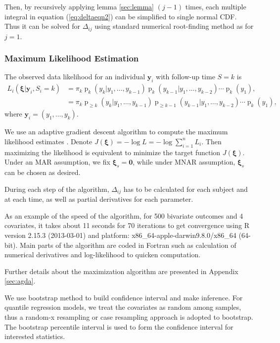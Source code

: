 \documentclass[12pt]{article}
\DeclareMathOperator{\pr}{p}
\begin{document}
\begin{itemize}
  Then, by recursively applying lemma \ref{sec:lemma} $(j-1)$ times,
  each multiple integral in equation (\ref{eq:deltaeqn2}) can be
  simplified to single normal CDF. Thus it can be solved for
  $\Delta_{ij}$ using standard numerical root-finding method as for $j
  = 1$.

\end{itemize}

\subsubsection{Maximum Likelihood Estimation}
\label{sec:mle}

The observed data likelihood for an individual $\bm y_i$ with
follow-up time $S = k$ is
\begin{align} \label{eq:ll} L_i(\bm \xi| \bm y_i, S_{i} = k) & =
  \pi_k\pr_k (y_k | y_1, \ldots, y_{k-1})
  \pr_k (y_{k-1}|y_1, \ldots, y_{k-2}) \cdots \pr_{k} (y_1), \\
  & = \pi_k \pr_{\geq k} (y_k | y_1, \ldots, y_{k-1}) \pr_{\geq k-1}
  (y_{k-1}|y_1, \ldots, y_{k-2}) \cdots \pr_{k} (y_1), \nonumber
\end{align}
where $\bm y_i = (y_1, \ldots, y_k)$.

We use an adaptive gradient descent algorithm to compute the maximum
likelihood estimates \citep{ried1993}. Denote $J(\bm \xi) = - \log L =
- \log \sum_{i = 1}^n L_i$.  Then maximizing the likelihood is
equivalent to minimize the target function $J(\bm \xi)$. Under an MAR
assumption, we fix $\bm \xi_s = \bm 0$, while under MNAR assumption,
$\bm \xi_s $ can be chosen as desired.

During each step of the algorithm, $\Delta_{ij}$ has to be calculated
for each subject and at each time, as well as partial derivatives for
each parameter.

As an example of the speed of the algorithm, for 500 bivariate
outcomes and 4 covariates, it takes about 11 seconds for 70 iterations
to get convergence using R version 2.15.3 (2013-03-01) \citep{R} and
platform: x86\_64-apple-darwin9.8.0/x86\_64 (64-bit). Main parts of
the algorithm are coded in Fortran such as calculation of numerical
derivatives and log-likelihood to quicken computation.

Further details about the maximization algorithm are presented in
Appendix \ref{sec:agda}.

We use bootstrap method \citep{efron1979,efron1993,divison1997} to
build confidence interval and make inference.  For quantile regression
models, we treat the covariates as random among samples, thus a
random-x resampling or case resampling approach is adopted to
bootstrap. The bootstrap percentile interval is used to form the
confidence interval for interested statistics.
\end{document}
